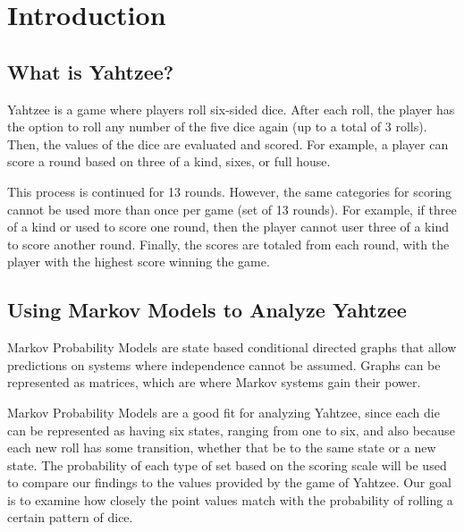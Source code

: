 \section{Introduction}

\subsection{What is Yahtzee?}

Yahtzee is a game where players roll six-sided dice. After each roll, the
player has the option to roll any number of the five dice again (up to a total
of 3 rolls). Then, the values of the dice are evaluated and scored. For example,
a player can score a round based on three of a kind, sixes, or full house.

This process is continued for 13 rounds. However, the same categories for scoring
cannot be used more than once per game (set of 13 rounds). For example, if three of
a kind or used to score one round, then the player cannot user three of a kind to
score another round. Finally, the scores are totaled from each round, with the
player with the highest score winning the game.

\subsection{Using Markov Models to Analyze Yahtzee}

Markov Probability Models are state based conditional directed graphs that
allow predictions on systems where independence cannot be assumed. Graphs can
be represented as matrices, which are where Markov systems gain their power.

Markov Probability Models are a good fit for analyzing Yahtzee, since each
die can be represented as having six states, ranging from one to six, and also
because each new roll has some transition, whether that be to the same state or
a new state. The probability of each type of set based on the scoring scale will
be used to compare our findings to the values provided by the game of Yahtzee.
Our goal is to examine how closely the point values match with the probability
of rolling a certain pattern of dice.
